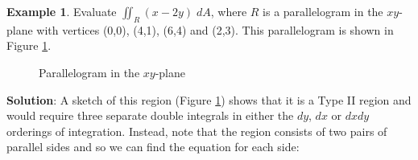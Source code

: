 \documentclass{article}
\theoremstyle{definition}
\newtheorem{example}{Example}[section]
\begin{document}
\begin{example}
Evaluate ${\displaystyle \iint_{R} (x - 2y) \; dA}$, where $R$ 
is a parallelogram in the $xy$-plane with vertices (0,0), (4,1), 
(6,4) and (2,3). This parallelogram is shown in 
Figure \ref{fig:parallelogram_R}.


\medskip
%
%
\begin{figure}[H]
\centering
  \resizebox{0.50 \textwidth}{!} {																%
  }	
  \caption{Parallelogram in the $xy$-plane}
  \label{fig:parallelogram_R}
\end{figure}


\bigskip
\noindent
{\bf Solution}: A sketch of this region (Figure
\ref{fig:parallelogram_R}) shows that it is a Type II region and
would require three separate double integrals in either the $dy$,
$dx$ or $dx dy$ orderings of integration.  Instead, note that the
region consists of two pairs of parallel sides and so we can find
the equation for each side:



\end{example}
\end{document}
